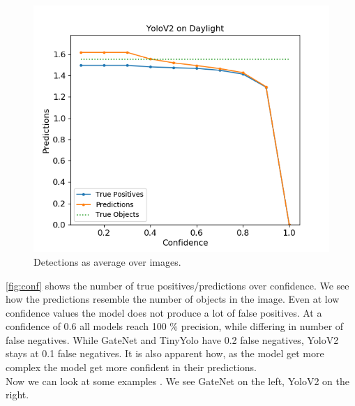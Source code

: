 \documentclass{article}
\begin{document}
\begin{figure}
\begin{minipage}{0.30\linewidth}
		\includegraphics[width=\linewidth]{fig/detection_v2}
	\end{minipage}
\caption{Detections as average over images.}
\label{fig:conf}
\end{figure}

\autoref{fig:conf} shows the number of true positives/predictions over confidence. We see how the predictions resemble the number of objects in the image. Even at low confidence values the model does not produce a lot of false positives. At a confidence of 0.6 all models reach 100 \% precision, while differing in number of false negatives. While GateNet and TinyYolo have 0.2 false negatives, YoloV2 stays at 0.1 false negatives. It is also apparent how, as the model get more complex the model get more confident in their predictions.
\\

Now we can look at some examples . We see GateNet on the left, YoloV2 on the right.
\end{document}
